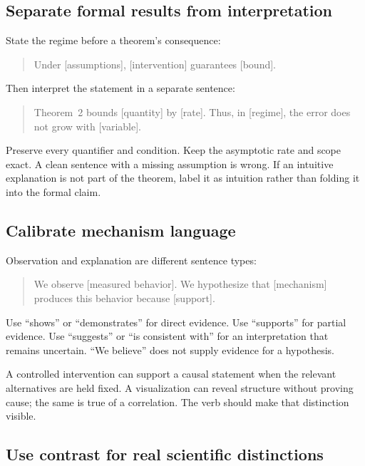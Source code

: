 \subsection{Separate formal results from interpretation}

State the regime before a theorem's consequence:

\begin{quote}
Under [assumptions], [intervention] guarantees [bound].
\end{quote}

Then interpret the statement in a separate sentence:

\begin{quote}
Theorem~2 bounds [quantity] by [rate]. Thus, in [regime], the error does not
grow with [variable].
\end{quote}

Preserve every quantifier and condition. Keep the asymptotic rate and scope
exact. A clean sentence with a missing assumption is wrong. If an intuitive
explanation is not part of the theorem, label it as intuition rather than
folding it into the formal claim.

\subsection{Calibrate mechanism language}

Observation and explanation are different sentence types:

\begin{quote}
We observe [measured behavior]. We hypothesize that [mechanism] produces this
behavior because [support].
\end{quote}

Use ``shows'' or ``demonstrates'' for direct evidence. Use ``supports'' for
partial evidence. Use ``suggests'' or ``is consistent with'' for an
interpretation that remains uncertain. ``We believe'' does not supply evidence
for a hypothesis.

A controlled intervention can support a causal statement when the relevant
alternatives are held fixed. A visualization can reveal structure without
proving cause; the same is true of a correlation. The verb should make that
distinction visible.

\subsection{Use contrast for real scientific distinctions}


